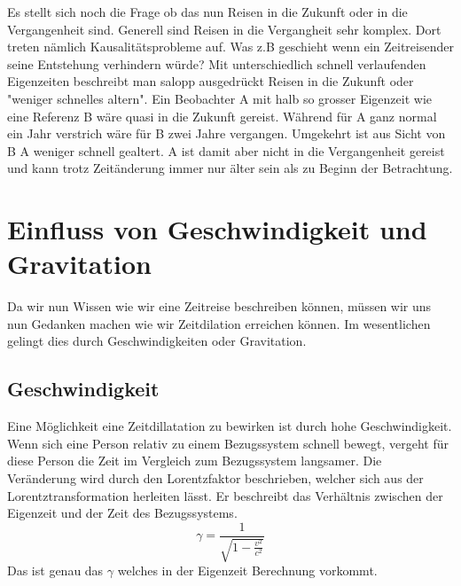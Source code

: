 \begin{refsection}
Es stellt sich noch die Frage ob das nun Reisen in die Zukunft oder in die Vergangenheit sind. Generell sind Reisen in die Vergangheit sehr komplex. Dort treten nämlich Kausalitätsprobleme auf. Was z.B geschieht wenn ein Zeitreisender seine Entstehung verhindern würde?
Mit unterschiedlich schnell verlaufenden Eigenzeiten beschreibt man salopp ausgedrückt Reisen in die Zukunft oder "weniger schnelles altern". Ein Beobachter A mit halb so grosser Eigenzeit wie eine Referenz B wäre quasi in die Zukunft gereist. Während für A ganz normal ein Jahr verstrich wäre für B zwei Jahre vergangen. Umgekehrt ist aus Sicht von B A weniger schnell gealtert. A ist damit aber nicht in die Vergangenheit gereist und kann trotz Zeit\"anderung immer nur älter sein als zu Beginn der Betrachtung.
\section{Einfluss von Geschwindigkeit und Gravitation}
Da wir nun Wissen wie wir eine Zeitreise beschreiben können, müssen wir uns nun Gedanken machen wie wir Zeitdilation erreichen können. Im wesentlichen gelingt dies durch Geschwindigkeiten oder Gravitation. 
\subsection{Geschwindigkeit}
Eine M\"oglichkeit eine Zeitdillatation zu bewirken ist durch hohe Geschwindigkeit. Wenn sich eine Person relativ zu einem Bezugssystem schnell bewegt, vergeht f\"ur diese Person die Zeit im Vergleich zum Bezugssystem langsamer. Die Ver\"anderung wird durch den Lorentzfaktor beschrieben, welcher sich aus der Lorentztransformation herleiten l\"asst. Er beschreibt das Verh\"altnis zwischen der Eigenzeit und der Zeit des Bezugssystems.
\begin{equation}
    \gamma=\frac{1}{\sqrt{1-\displaystyle\frac{v^2}{c^2}}} 
\end{equation}
Das ist genau das $\gamma$ welches in der Eigenzeit Berechnung vorkommt.


\end{refsection}
